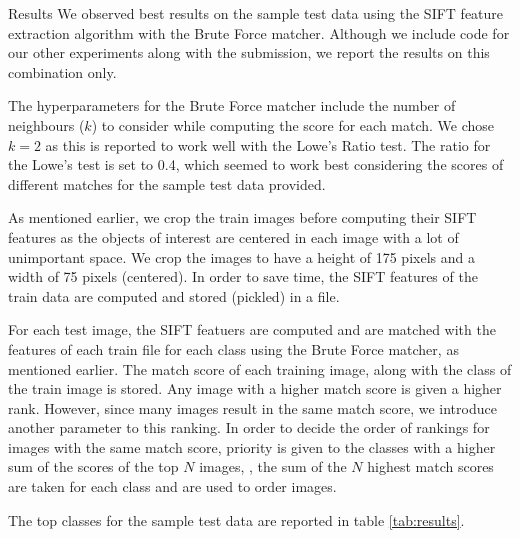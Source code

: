 \documentclass{article}
\begin{document}
\begin{ssection}{Results}
    We observed best results on the sample test data using the SIFT feature extraction algorithm with the Brute Force matcher. Although we include code for our other experiments along with the submission, we report the results on this combination only.
    
     The hyperparameters for the Brute Force matcher include the number of neighbours ($k$) to consider while computing the score for each match. We chose $k = 2$ as this is reported to work well with the Lowe's Ratio test. The ratio for the Lowe's test is set to 0.4, which seemed to work best considering the scores of different matches for the sample test data provided.
    
    As mentioned earlier, we crop the train images before computing their SIFT features as the objects of interest are centered in each image with a lot of unimportant space. We crop the images to have a height of 175 pixels and a width of 75 pixels (centered). In order to save time, the SIFT features of the train data are computed and stored (pickled) in a file.
    
    For each test image, the SIFT featuers are computed and are matched with the features of each train file for each class using the Brute Force matcher, as mentioned earlier. The match score of each training image, along with the class of the train image is stored. Any image with a higher match score is given a higher rank. However, since many images result in the same match score, we introduce another parameter to this ranking. In order to decide the order of rankings for images with the same match score, priority is given to the classes with a higher sum of the scores of the top $N$ images, \ie, the sum of the $N$ highest match scores are taken for each class and are used to order images.
    
    The top classes for the sample test data are reported in table \ref{tab:results}.
    

\end{ssection}
\end{document}
